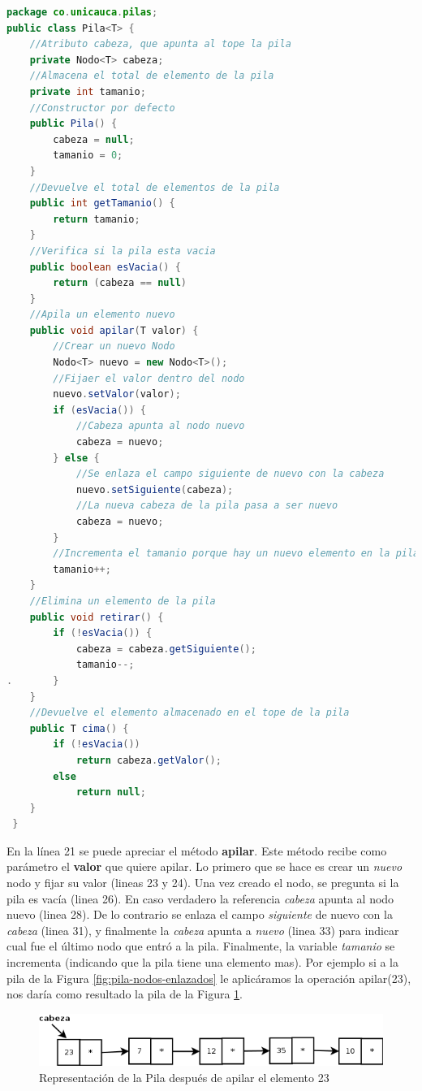 \begin{lstlisting}[language=Java]
package co.unicauca.pilas;
public class Pila<T> {
    //Atributo cabeza, que apunta al tope la pila
 	private Nodo<T> cabeza;
 	//Almacena el total de elemento de la pila
 	private int tamanio;
    //Constructor por defecto
 	public Pila() {
 		cabeza = null;
 		tamanio = 0;
 	}
	//Devuelve el total de elementos de la pila
 	public int getTamanio() {
 		return tamanio;
 	}
	//Verifica si la pila esta vacia
 	public boolean esVacia() {
 		return (cabeza == null)
 	}
	//Apila un elemento nuevo
 	public void apilar(T valor) {
	 	//Crear un nuevo Nodo
 		Nodo<T> nuevo = new Nodo<T>();
	 	//Fijaer el valor dentro del nodo
 		nuevo.setValor(valor);
 		if (esVacia()) {
	 		//Cabeza apunta al nodo nuevo
 			cabeza = nuevo;
 		} else {
	 		//Se enlaza el campo siguiente de nuevo con la cabeza
 			nuevo.setSiguiente(cabeza);
 			//La nueva cabeza de la pila pasa a ser nuevo
 			cabeza = nuevo;
 		}
 		//Incrementa el tamanio porque hay un nuevo elemento en la pila
 		tamanio++;
 	}
	//Elimina un elemento de la pila
 	public void retirar() {
 		if (!esVacia()) {
 			cabeza = cabeza.getSiguiente();
 			tamanio--;
. 		}
 	}
	//Devuelve el elemento almacenado en el tope de la pila
 	public T cima() {
 		if (!esVacia())
 			return cabeza.getValor();
 		else
 			return null;
 	}
 }
\end{lstlisting}

En la línea 21 se puede apreciar el método \textbf{apilar}. Este método recibe como parámetro el \textbf{valor} que quiere apilar. Lo primero que se hace es crear un \textit{nuevo} nodo y fijar su valor (lineas 23 y 24). Una vez creado el nodo, se pregunta si la pila es vacía (linea 26). En caso verdadero la referencia \textit{cabeza} apunta al nodo nuevo (linea 28). De lo contrario se enlaza el campo \textit{siguiente} de nuevo con la \textit{cabeza} (linea 31), y finalmente la \textit{cabeza} apunta a \textit{nuevo} (linea 33) para indicar cual fue el último nodo que entró a la pila. Finalmente, la variable \textit{tamanio} se incrementa (indicando que la pila tiene una elemento mas). Por ejemplo si a la pila de la Figura \ref{fig:pila-nodos-enlazados} le aplicáramos la operación apilar(23), nos daría como resultado la pila de la Figura \ref{fig:pila-nodos-enlazados-apilar}.

\begin{figure}
	\centering
	\includegraphics[scale=0.7]{Diagramas/RepresentacionPilaNodosEnlazadosApilar}
	\caption{Representación de la Pila después de apilar el elemento 23}	
	\label{fig:pila-nodos-enlazados-apilar}
\end{figure}

